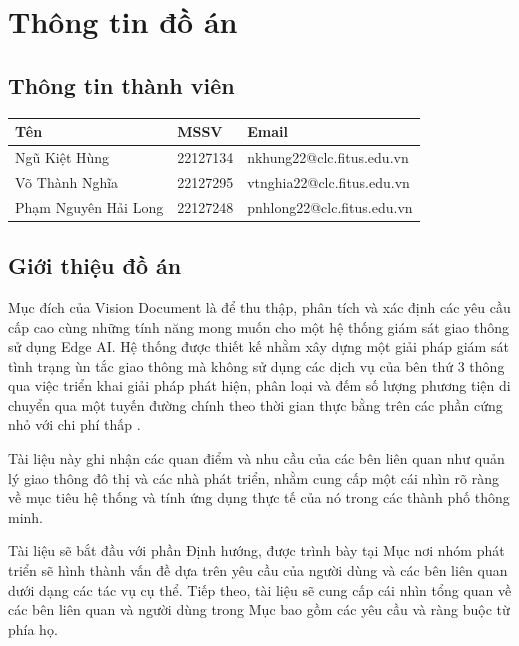\section{Thông tin đồ án}

\subsection{Thông tin thành viên}

\begin{table}[!ht]
\centering
\renewcommand{\arraystretch}{1.25}
\begin{tabular}{|>{\centering\arraybackslash}m{5cm}|>{\centering\arraybackslash}m{3cm}|>{\centering\arraybackslash}m{8cm}|}
    \hline
    \Large \textbf{Tên} & \Large \textbf{MSSV} & \Large \textbf{Email} \\
    \hline
    \Large Ngũ Kiệt Hùng & \Large 22127134 & \Large nkhung22@clc.fitus.edu.vn \\
    \hline
    \Large Võ Thành Nghĩa & \Large 22127295 & \Large vtnghia22@clc.fitus.edu.vn \\
    \hline
    \normalsize Phạm Nguyên Hải Long  & \Large 22127248 & \Large pnhlong22@clc.fitus.edu.vn \\
    \hline
\end{tabular}
\end{table}

\subsection{Giới thiệu đồ án}
\quad Mục đích của Vision Document là để thu thập, phân tích và xác định các yêu cầu cấp cao cùng những tính năng mong muốn cho một hệ thống giám sát giao thông sử dụng Edge AI. Hệ thống được thiết kế nhằm xây dựng một giải pháp giám sát tình trạng ùn tắc giao thông mà không sử dụng các dịch vụ của bên thứ 3 thông qua việc triển khai giải pháp phát hiện, phân loại và đếm số lượng phương tiện di chuyển qua một tuyến đường chính theo thời gian thực bằng  trên các phần cứng nhỏ với chi phí thấp .

\quad Tài liệu này ghi nhận các quan điểm và nhu cầu của các bên liên quan như quản lý giao thông đô thị và các nhà phát triển, nhằm cung cấp một cái nhìn rõ ràng về mục tiêu hệ thống và tính ứng dụng thực tế của nó trong các thành phố thông minh.

\quad Tài liệu sẽ bắt đầu với phần Định hướng, được trình bày tại Mục  nơi nhóm phát triển sẽ hình thành vấn đề dựa trên yêu cầu của người dùng và các bên liên quan dưới dạng các tác vụ cụ thể. Tiếp theo, tài liệu sẽ cung cấp cái nhìn tổng quan về các bên liên quan và người dùng trong Mục  bao gồm các yêu cầu và ràng buộc từ phía họ.


